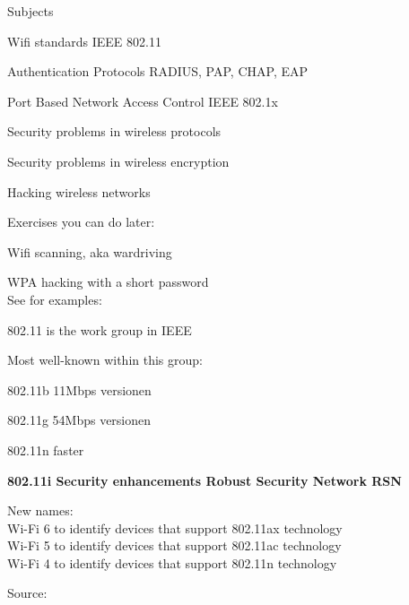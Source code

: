 \documentclass[Screen16to9,17pt]{foils}
\begin{document}

\begin{list1}
\item Subjects
\begin{list2}

\item Wifi standards IEEE 802.11
\item Authentication Protocols RADIUS, PAP, CHAP, EAP
\item Port Based Network Access Control IEEE 802.1x
\item Security problems in wireless protocols
\item Security problems in wireless encryption
\item Hacking wireless networks
\end{list2}
\item Exercises you can do later:
\begin{list2}
\item Wifi scanning, aka wardriving
\item WPA hacking with a short password\\
See for examples: 
\end{list2}
\end{list1}




\begin{list1}
\item 802.11 is the work group in IEEE
\item Most well-known within this group:
\begin{list2}
\item 802.11b 11Mbps versionen
\item 802.11g 54Mbps versionen
\item 802.11n faster
\item {\bf 802.11i Security enhancements Robust Security Network RSN}
\end{list2}
\item New names:\\
Wi-Fi 6 to identify devices that support 802.11ax technology\\
Wi-Fi 5 to identify devices that support 802.11ac technology\\
Wi-Fi 4 to identify devices that support 802.11n technology
\end{list1}

Source: 
\end{document}
